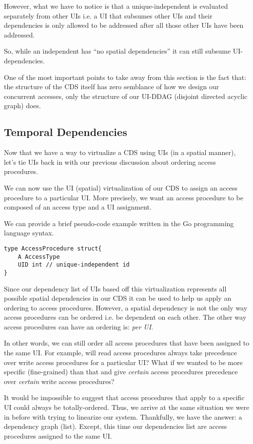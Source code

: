 However, what we have to notice is that a unique-independent is evaluated separately from other UIs i.e. a UI that subsumes other UIs and their dependencies is only allowed to be addressed after all those other UIs have been addressed.

So, while an independent has ``no spatial dependencies'' it can still subsume UI-dependencies. 

One of the most important points to take away from this section is the fact that: the structure of the CDS itself has zero semblance of how we design our concurrent accesses, only the structure of our UI-DDAG (disjoint directed acyclic graph) does.

\subsection{Temporal Dependencies}

Now that we have a way to virtualize a CDS using UIs (in a spatial manner), let's tie UIs back in with our previous discussion about ordering access procedures.

We can now use the UI (spatial) virtualization of our CDS to assign an access procedure to a particular UI. More precisely, we want an access procedure to be composed of an access type and a UI assignment. 

We can provide a brief pseudo-code example written in the Go programming language syntax.

\begin{verbatim}
type AccessProcedure struct{
	A AccessType
	UID int // unique-independent id
}
\end{verbatim}

Since our dependency list of UIs based off this virtualization represents all possible spatial dependencies in our CDS it can be used to help us apply an ordering to access procedures. However, a spatial dependency is not the only way access procedures can be ordered i.e. be dependent on each other. The other way access procedures can have an ordering is: \textit{per UI}.

In other words, we can still order all access procedures that have been assigned to the same UI. For example, will read access procedures always take precedence over write access procedures for a particular UI? What if we wanted to be more specific (fine-grained) than that and give \textit{certain} access procedures precedence over \textit{certain} write access procedures?

It would be impossible to suggest that access procedures that apply to a specific UI could always be totally-ordered. Thus, we arrive at the same situation we were in before with trying to linearize our system. Thankfully, we have the answer: a dependency graph (list). Except, this time our dependencies list are access procedures assigned to the same UI. 

